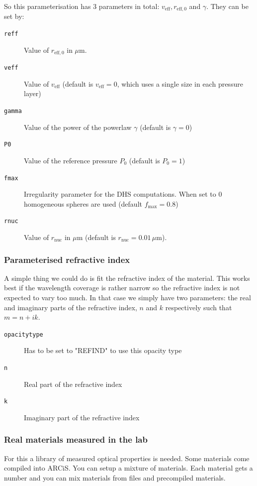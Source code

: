 \documentclass[12pt]{article}
\begin{document}
So this parameterisation has 3 parameters in total: $v_\mathrm{eff}, r_\mathrm{eff,0}$ and $\gamma$. They can be set by:
\begin{description}
\item[\texttt{reff}]
Value of $r_\mathrm{eff,0}$ in $\mu$m.
\item[\texttt{veff}]
Value of $v_\mathrm{eff}$ (default is $v_\mathrm{eff}=0$, which uses a single size in each pressure layer)
\item[\texttt{gamma}]
Value of the power of the powerlaw $\gamma$ (default is $\gamma=0$)
\item[\texttt{P0}]
Value of the reference pressure $P_0$ (default is $P_0=1$)
\item[\texttt{fmax}]
Irregularity parameter for the DHS computations. When set to 0 homogeneous spheres are used (default $f_\mathrm{max}=0.8$)
\item[\texttt{rnuc}]
Value of $r_\mathrm{nuc}$ in $\mu$m (default is $r_\mathrm{nuc}=0.01\,\mu$m).
\end{description}

\subsubsection*{Parameterised refractive index}

A simple thing we could do is fit the refractive index of the material. This works best if the wavelength coverage is rather narrow so the refractive index is not expected to vary too much. In that case we simply have two parameters: the real and imaginary parts of the refractive index, $n$ and $k$ respectively such that $m=n+ik$.

\begin{description}
\item[\texttt{opacitytype}]
Has to be set to "REFIND" to use this opacity type
\item[\texttt{n}]
Real part of the refractive index
\item[\texttt{k}]
Imaginary part of the refractive index
\end{description}

\subsubsection*{Real materials measured in the lab}

For this a library of measured optical properties is needed. Some materials come compiled into ARCiS. You can setup a mixture of materials. Each material gets a number and you can mix materials from files and precompiled materials.
\end{document}
